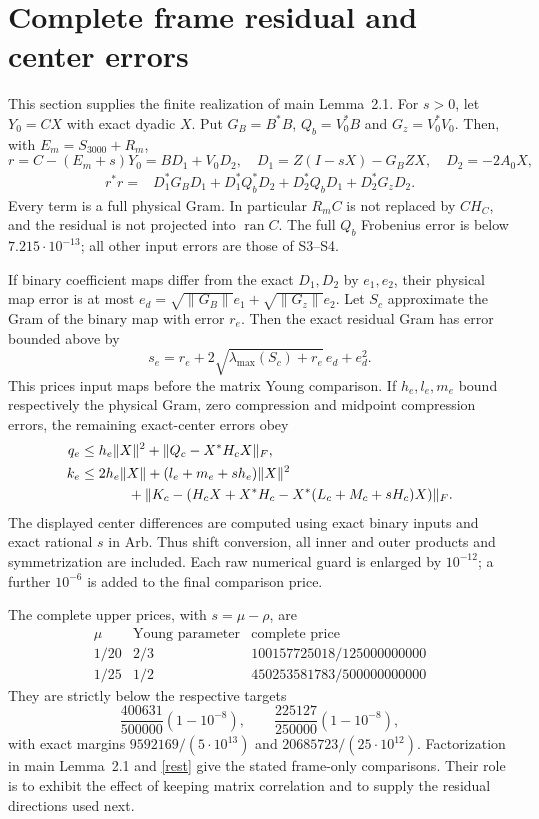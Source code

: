 \documentclass[11pt]{article}
\newcommand{\Ran}{\operatorname{ran}}
\numberwithin{equation}{section}
\begin{document}
\section{Complete frame residual and center errors}\label{residual}
This section supplies the finite realization of main Lemma~2.1.
For $s>0$, let $Y_0=CX$ with exact dyadic $X$. Put
$G_B=B^*B$, $Q_b=V_0^*B$ and $G_z=V_0^*V_0$.
Then, with $E_m=S_{3000}+R_m$,
\[
 r=C-(E_m+s)Y_0=BD_1+V_0D_2,
 \quad D_1=Z(I-sX)-G_BZX,\quad D_2=-2A_0X,
\]
\begin{align*}
 r^*r={}&D_1^*G_BD_1+D_1^*Q_b^*D_2
               +D_2^*Q_bD_1+D_2^*G_zD_2.
\end{align*}
Every term is a full physical Gram. In particular $R_mC$ is not
replaced by $CH_C$, and the residual is not projected into $\Ran C$.
The full $Q_b$ Frobenius error is below $7.215\cdot10^{-13}$;
all other input errors are those of S3--S4.

If binary coefficient maps differ from the exact $D_1,D_2$ by
$e_1,e_2$, their physical map error is at most
$e_d=\sqrt{\|G_B\|}e_1+\sqrt{\|G_z\|}e_2$.
Let $S_c$ approximate the Gram of the binary map with error $r_e$.
Then the exact residual Gram has error bounded above by
\[
 s_e=r_e+2\sqrt{\lambda_{\max}(S_c)+r_e}\,e_d+e_d^2.
\]
This prices input maps before the matrix Young comparison.
If $h_e,l_e,m_e$ bound respectively the physical Gram, zero compression
and midpoint compression errors, the remaining exact-center errors obey
\begin{align*}
 q_e&\le h_e\|X\|^2+
       \|Q_c-X^*H_cX\|_F,\\
 k_e&\le2h_e\|X\|+(l_e+m_e+sh_e)\|X\|^2\\
 &\hspace{12mm}+\|K_c-(H_cX+X^*H_c-X^*(L_c+M_c+sH_c)X)\|_F.
\end{align*}
The displayed center differences are computed using exact binary
inputs and exact rational $s$ in Arb. Thus shift conversion, all inner
and outer products and symmetrization are included. Each raw numerical
guard is enlarged by $10^{-12}$; a further $10^{-6}$ is added to the
final comparison price.

The complete upper prices, with $s=\mu-\rho$, are
\[
 \begin{array}{c|c|c}
 \mu&\text{Young parameter}&\text{complete price}\\\hline
 1/20&2/3&100157725018/125000000000\\
 1/25&1/2&450253581783/500000000000
 \end{array}
\]
They are strictly below the respective targets
\[
 \frac{400631}{500000}(1-10^{-8}),\qquad
 \frac{225127}{250000}(1-10^{-8}),
\]
with exact margins $9592169/(5\cdot10^{13})$ and
$20685723/(25\cdot10^{12})$.
Factorization in main Lemma~2.1 and \eqref{rest} give the stated
frame-only comparisons. Their role is to exhibit the effect of keeping
matrix correlation and to supply the residual directions used next.
\end{document}

